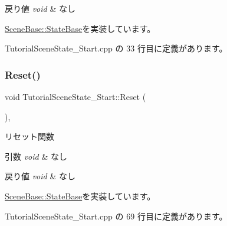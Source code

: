 \begin{DoxyRetVals}{戻り値}
{\em void} & なし \\
\hline
\end{DoxyRetVals}


\mbox{\hyperlink{class_scene_base_1_1_state_base_a33350231b039a2178c19beac0211c5b8}{Scene\+Base\+::\+State\+Base}}を実装しています。



 Tutorial\+Scene\+State\+\_\+\+Start.\+cpp の 33 行目に定義があります。

\mbox{\label{class_tutorial_scene_state___start_a40bfdf7acd93b619138bf708adff31e4}} 
\subsubsection{\texorpdfstring{Reset()}{Reset()}}
{\footnotesize\ttfamily void Tutorial\+Scene\+State\+\_\+\+Start\+::\+Reset (\begin{DoxyParamCaption}{ }\end{DoxyParamCaption})\hspace{0.3cm}{\ttfamily [override]}, {\ttfamily [virtual]}}



リセット関数 


\begin{DoxyParams}{引数}
{\em void} & なし \\
\hline
\end{DoxyParams}

\begin{DoxyRetVals}{戻り値}
{\em void} & なし \\
\hline
\end{DoxyRetVals}


\mbox{\hyperlink{class_scene_base_1_1_state_base_a2e14a3afece0b1d8db9edcebf514a977}{Scene\+Base\+::\+State\+Base}}を実装しています。



 Tutorial\+Scene\+State\+\_\+\+Start.\+cpp の 69 行目に定義があります。

\mbox{\label{class_tutorial_scene_state___start_a974962addfb0bcba90fbab64ac6d50f0}} 
